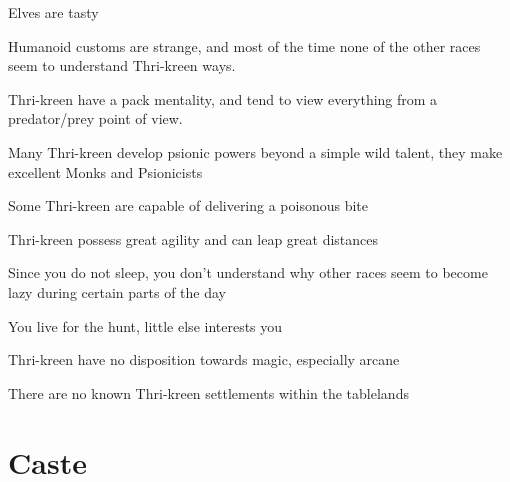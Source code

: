 \begin{multicols}{2}
\begin{description}
    \item Elves are tasty
    \item Humanoid customs are strange, and most of the time none of the other races seem to understand Thri-kreen ways.
    \item Thri-kreen have a pack mentality, and tend to view everything from a predator/prey point of view.
    \item Many Thri-kreen develop psionic powers beyond a simple wild talent, they make excellent Monks and Psionicists
    \item Some Thri-kreen are capable of delivering a poisonous bite
    \item Thri-kreen possess great agility and can leap great distances
    \item Since you do not sleep, you don’t understand why other races seem to become lazy during certain parts of the day
    \item You live for the hunt, little else interests you
    \item Thri-kreen have no disposition towards magic, especially arcane
    \item There are no known Thri-kreen settlements within the tablelands
\end{description}

\end{multicols}

\section{Caste}

